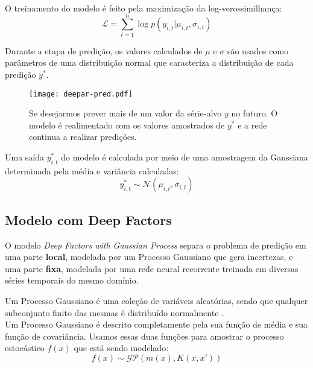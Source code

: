 
O treinamento do modelo é feito pela maximização da log-verossimilhança: \\

\begin{equation}
  \mathcal{L} = \sum^n_{t=1}{\log p(y_{i,t} | \mu_{i,t},\sigma_{i,t})}
  \end{equation}

Durante a etapa de predição, os valores calculados de $\mu$ e $\sigma$ são
usados como parâmetros de uma distribuição normal que caracteriza a distribuição
de cada predição $y^*$.


\begin{figure}[H]
  \centering
  \texttt{[image: deepar-pred.pdf]}
  \caption{Se desejarmos prever mais de um valor da série-alvo $y$ no futuro. O
    modelo é realimentado com os valores amostrados de $y^*$ e a rede continua a
  realizar predições.}
  \label{fig:deepartrain}
\end{figure}


Uma saída $y^*_{i,t}$ do modelo é calculada por meio de uma amostragem da Gaussiana determinada pela média e variância calculadas: \\

\[
 y^*_{i,t} \sim \mathcal{N}(\mu_{i,t},\sigma_{i,t}) 
\]

\subsection{Modelo com Deep Factors}

O modelo \textit{Deep Factors with Gaussian Process} \citep{deepfactors} separa o problema de predição em uma parte \textbf{local}, modelada por um Processo Gaussiano que gera incertezas, e uma parte \textbf{fixa}, modelada por uma rede neural recorrente treinada em diversas séries temporais do mesmo domínio.


Um Processo Gaussiano é uma coleção de variáveis aleatórias,
sendo que qualquer subconjunto finito das mesmas é distribuído normalmente \citep{gpml}. \\

Um Processo Gaussiano é descrito completamente pela sua função de média e sua função de covariância. Usamos essas duas funções para amostrar o processo estocástico $f(x)$ que está sendo modelado: \\

\[
f(x) \sim \mathcal{GP}( m(x), K(x,x'))
\]

